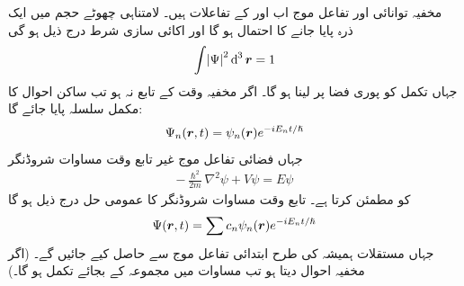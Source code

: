 مخفیہ توانائی  اور تفاعل موج  اب  اور  کے تفاعلات ہیں۔ لامتناہی چھوٹے حجم  میں ایک ذرہ پایا جانے کا احتمال  ہو گا اور اکائی سازی شرط درج ذیل ہو گی
\begin{align}\label{مساوات_ابعادی_معمول_زنی_شرط}
\int\abs{\Psi}^{2}\dif^{\,3}\kvec{r}=1 
\end{align}
جہاں تکمل کو پوری فضا پر لینا ہو گا۔ اگر مخفیہ وقت کے تابع نہ ہو تب ساکن احوال کا مکمل سلسلہ پایا جائے گا:
\begin{align}
\Psi_{n}({{\boldsymbol{r}}},t)=\psi_{n}({{\boldsymbol{r}}})e^{-iE_{n}t/\hslash} 
\end{align}
جہاں فضائی تفاعل موج  غیر تابع وقت مساوات شروڈنگر 
\begin{align}
-\frac{\hslash^{2}}{2m}\nabla^{2}\psi+V\psi=E\psi
\end{align}
کو مطمئن کرتا ہے۔ تابع وقت مساوات شروڈنگر کا عمومی حل درج ذیل ہو گا
\begin{align}\label{مساوات_ابعادی_عمومی_حل_الف}
\Psi({{\boldsymbol{r}}},t)=\sum c_{n}\psi_{n}({{\boldsymbol{r}}})e^{-iE_{n}t/\hslash} 
\end{align}
جہاں مستقلات  ہمیشہ کی طرح ابتدائی تفاعل موج  سے حاصل کیے جائیں گے۔ (اگر مخفیہ  احوال دیتا ہو تب مساوات  میں مجموعہ کے بجائے تکمل ہو گا۔)

